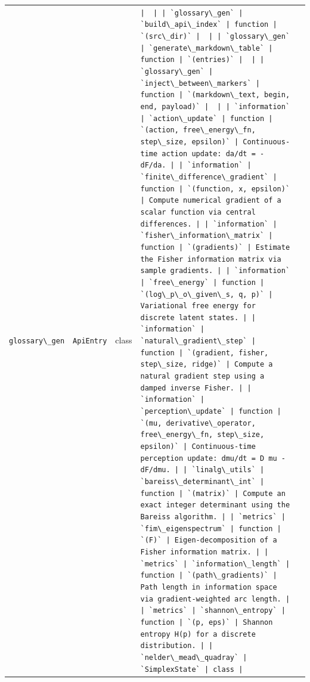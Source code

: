 \documentclass[
  10pt,
]{article}
\newcommand{\passthrough}[1]{#1}
\begin{document}
\begin{longtable}[]{@{}lllll@{}}
\begin{minipage}[t]{0.17\columnwidth}\raggedright
\passthrough{\lstinline!glossary\_gen!}\strut
\end{minipage} & \begin{minipage}[t]{0.17\columnwidth}\raggedright
\passthrough{\lstinline!ApiEntry!}\strut
\end{minipage} & \begin{minipage}[t]{0.17\columnwidth}\raggedright
class\strut
\end{minipage} & \begin{minipage}[t]{0.17\columnwidth}\raggedright
\passthrough{\lstinline!|  | | `glossary\_gen` | `build\_api\_index` | function | `(src\_dir)` |  | | `glossary\_gen` | `generate\_markdown\_table` | function | `(entries)` |  | | `glossary\_gen` | `inject\_between\_markers` | function | `(markdown\_text, begin, end, payload)` |  | | `information` | `action\_update` | function | `(action, free\_energy\_fn, step\_size, epsilon)` | Continuous-time action update: da/dt = - dF/da. | | `information` | `finite\_difference\_gradient` | function | `(function, x, epsilon)` | Compute numerical gradient of a scalar function via central differences. | | `information` | `fisher\_information\_matrix` | function | `(gradients)` | Estimate the Fisher information matrix via sample gradients. | | `information` | `free\_energy` | function | `(log\_p\_o\_given\_s, q, p)` | Variational free energy for discrete latent states. | | `information` | `natural\_gradient\_step` | function | `(gradient, fisher, step\_size, ridge)` | Compute a natural gradient step using a damped inverse Fisher. | | `information` | `perception\_update` | function | `(mu, derivative\_operator, free\_energy\_fn, step\_size, epsilon)` | Continuous-time perception update: dmu/dt = D mu - dF/dmu. | | `linalg\_utils` | `bareiss\_determinant\_int` | function | `(matrix)` | Compute an exact integer determinant using the Bareiss algorithm. | | `metrics` | `fim\_eigenspectrum` | function | `(F)` | Eigen-decomposition of a Fisher information matrix. | | `metrics` | `information\_length` | function | `(path\_gradients)` | Path length in information space via gradient-weighted arc length. | | `metrics` | `shannon\_entropy` | function | `(p, eps)` | Shannon entropy H(p) for a discrete distribution. | | `nelder\_mead\_quadray` | `SimplexState` | class |!}\strut
\end{minipage} & \begin{minipage}[t]{0.17\columnwidth}\raggedright
\strut
\end{minipage}\tabularnewline

\end{longtable}
\end{document}
